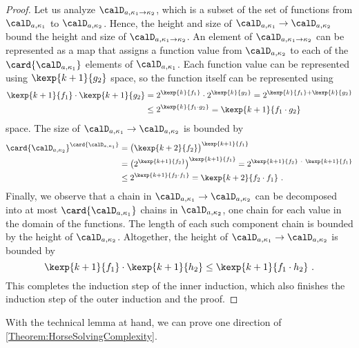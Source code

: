 \documentclass[../../diss.tex]{subfiles}
\begin{document}
\begin{proof}
    Let us analyze $\domaina{\kappa_1 \to \kappa_2}$, which is a subset of the set of functions from $\domaina{\kappa_1}$ to $\domaina{\kappa_2}$.
    Hence, the height and size of $\domaina{\kappa_1} \to \domaina{\kappa_2}$ bound the height and size of $\domaina{\kappa_1 \to \kappa_2}$.
    An element of $\domaina{\kappa_1 \to \kappa_2}$ can be represented as a map that assigns a function value from $\domaina{\kappa_2}$ to each of the
    $\card{\domaina{\kappa_1}}$ elements of $\domaina{\kappa_1}$.
    Each function value can be represented using $\kexp{k+1}{g_2}$ space, so the function itself can be represented using
    \begin{align*}
        \kexp{k+1}{f_1} \cdot \kexp{k+1}{g_2}
        &=
        2^{\kexp{k}{f_1}} \cdot 2^{\kexp{k}{g_2}}
        =
        2^{\kexp{k}{f_1} + \kexp{k}{g_2}}
        \\
        &\leq
        2^{\kexp{k}{f_1 \cdot g_2}}
        =
        \kexp{k+1}{f_1 \cdot g_2}
    \end{align*}
    space.
    The size of $\domaina{\kappa_1} \to \domaina{\kappa_2}$ is bounded by
    \begin{align*}
        \card{\domaina{\kappa_2}}^{\card{\domaina{\kappa_1}}}
        &=
        {\big(\kexp{k+2}{f_2}\big)}^{\kexp{k+1}{f_1}}
        \\
        &= {\big(2^{\kexp{k+1}{f_2}}\big)}^{\kexp{k+1}{f_1}}
        = 2^{\kexp{k+1}{f_2} \ \cdot \ \kexp{k+1}{f_1}}
        \\
        &\leq 2^{\kexp{k+1}{f_2 \cdot f_1}}
        = \kexp{k+2}{f_2 \cdot f_1}
        \ .
    \end{align*}
    Finally, we observe that a chain in $\domaina{\kappa_1} \to \domaina{\kappa_2}$ can be decomposed into at most $\card{\domaina{\kappa_1}}$ chains in $\domaina{\kappa_2}$, one chain for each value in the domain of the functions.
    The length of each such component chain is bounded by the height of $\domaina{\kappa_2}$.
    Altogether, the height of $\domaina{\kappa_1} \to \domaina{\kappa_2}$ is bounded by
    \[
        \kexp{k+1}{f_1} \cdot \kexp{k+1}{h_2}
        \leq
        \kexp{k+1}{f_1 \cdot h_2}
        \ .
    \]
    This completes the induction step of the inner induction, which also finishes the induction step of the outer induction and the proof.
\end{proof}

With the technical lemma at hand, we can prove one direction of \cref{Theorem:HorseSolvingComplexity}.
\end{document}
